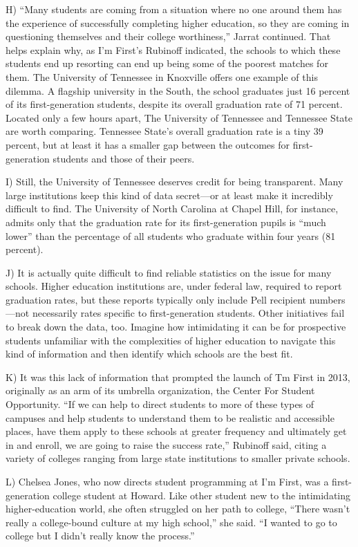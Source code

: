 \documentclass[UTF8,11pt]{ctexart}
\begin{document}
H) “Many students are coming from a situation where no one around them has the experience of successfully completing higher education, so they are coming in questioning themselves and their college worthiness,” Jarrat continued. That helps explain why, as I’m First’s Rubinoff indicated, the schools to which these students end up resorting can end up being some of the poorest matches for them. The University of Tennessee in Knoxville offers one example of this dilemma. A flagship university in the South, the school graduates just 16 percent of its first-generation students, despite its overall graduation rate of 71 percent. Located only a few hours apart, The University of Tennessee and Tennessee State are worth comparing. Tennessee State’s overall graduation rate is a tiny 39 percent, but at least it has a smaller gap between the outcomes for first-generation students and those of their peers.


I) Still, the University of Tennessee deserves credit for being transparent. Many large institutions keep this kind of data secret—or at least make it incredibly difficult to find. The University of North Carolina at Chapel Hill, for instance, admits only that the graduation rate for its first-generation pupils is “much lower” than the percentage of all students who graduate within four years (81 percent).


J) It is actually quite difficult to find reliable statistics on the issue for many schools. Higher education institutions are, under federal law, required to report graduation rates, but these reports typically only include Pell recipient numbers—not necessarily rates specific to first-generation students. Other initiatives fail to break down the data, too. Imagine how intimidating it can be for prospective students unfamiliar with the complexities of higher education to navigate this kind of information and then identify which schools are the best fit.


K) It was this lack of information that prompted the launch of Tm First in 2013, originally as an arm of its umbrella organization, the Center For Student Opportunity. “If we can help to direct students to more of these types of campuses and help students to understand them to be realistic and accessible places, have them apply to these schools at greater frequency and ultimately get in and enroll, we are going to raise the success rate,” Rubinoff said, citing a variety of colleges ranging from large state institutions to smaller private schools.


L) Chelsea Jones, who now directs student programming at I’m First, was a first-generation college student at Howard. Like other student new to the intimidating higher-education world, she often struggled on her path to college, “There wasn’t really a college-bound culture at my high school,” she said. “I wanted to go to college but I didn’t really know the process.”
\end{document}
